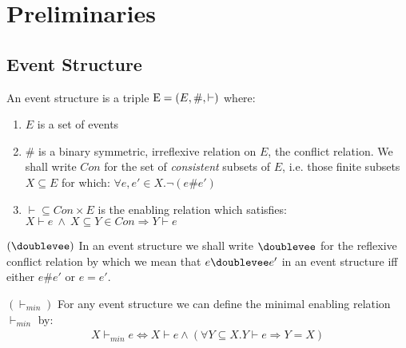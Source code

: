 \section{Preliminaries}
\subsection{Event Structure \cite{es}}
\begin{definition}
    An event structure is a triple $\mathrm{E} = (E,\#,\vdash)$ where:
    \begin{enumerate}
        \item $E$ is a set of events
        \item \# is a binary symmetric, irreflexive relation on $E$,
              the conflict relation.
              We shall write $Con$ for the set of 
              \textit{consistent} subsets of $E$,
              i.e. those finite subsets $X \subseteq E$ for which:
              $\forall e,e' \in X . \neg (e\#e')$
        \item $\vdash \subseteq Con \times E$ is the enabling relation which satisfies:
              $ X \vdash e \ \wedge \ X \subseteq Y \in Con \Rightarrow Y \vdash e$
    \end{enumerate}

\end{definition}

\begin{comment}
    salam
\end{comment}

\begin{notion}{$(\doublevee)$}
    In an event structure we shall write $\doublevee$ for the reflexive conflict relation by which we mean
    that $e\doublevee e'$ in an event structure iff either $e\#e'$ or $e=e'$.
\end{notion}

\begin{notion}{$(\vdash_{min})$}
    For any event structure we can define the minimal enabling relation $\vdash_{min}$ by:
    \begin{align*}
        X \vdash_{min} e \iff X \vdash e \wedge
        ( \forall Y \subseteq X . Y \vdash e \Rightarrow Y = X )
    \end{align*}
\end{notion}

